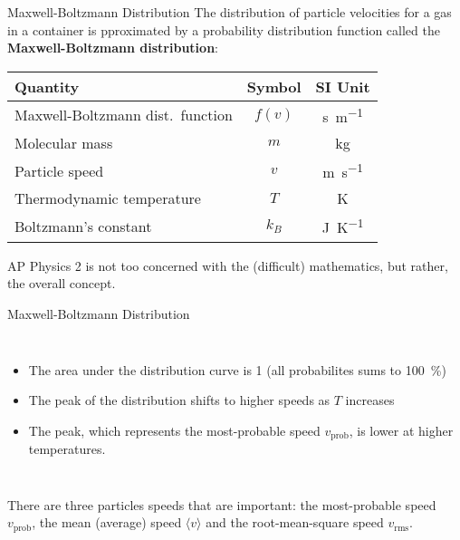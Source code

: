 \documentclass[12pt,aspectratio=169]{beamer}
\begin{document}
\begin{frame}{Maxwell-Boltzmann Distribution}
  The distribution of particle velocities for a gas in a container is
  pproximated by a probability distribution function called the
  \textbf{Maxwell-Boltzmann distribution}:


  \begin{center}
    \begin{tabular}{l|c|c}
      \rowcolor{pink}
      \textbf{Quantity} & \textbf{Symbol} & \textbf{SI Unit} \\ \hline
      Maxwell-Boltzmann dist.\ function & $f(v)$ &\si{\second\per\metre}\\
      Molecular mass            & $m$        & \si{\kilo\gram} \\
      Particle speed            & $v$        & \si{\metre\per\second} \\
      Thermodynamic temperature & $T$        & \si{\kelvin} \\
      Boltzmann's constant      & $k_B$      & \si{\joule\per\kelvin}
    \end{tabular}
  \end{center}
  AP Physics 2 is not too concerned with the (difficult) mathematics,
  but rather, the overall concept.
\end{frame}



\begin{frame}{Maxwell-Boltzmann Distribution}
  \vspace{.15in}\begin{columns}
    
    \begin{itemize}
    \item The area under the distribution curve is 1 (all probabilites sums to
      \SI{100}{\percent})
    \item The peak of the distribution shifts to higher speeds as $T$ increases
    \item The peak, which represents the most-probable speed $v_\text{prob}$,
      is lower at higher temperatures.
    \end{itemize}
  \end{columns}
  \vspace{.2in}There are three particles speeds that are important: the
  most-probable speed $v_\text{prob}$, the mean (average) speed
  $\langle v \rangle$ and the root-mean-square speed $v_\text{rms}$.
\end{frame}
\end{document}
